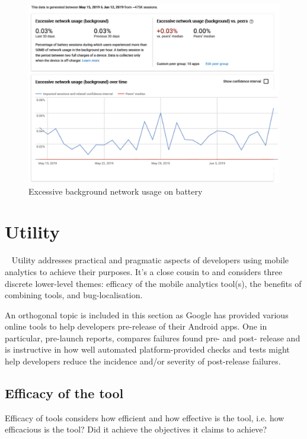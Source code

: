 \begin{figure}[!htbp]
    \centering
    \includegraphics[width=\textwidth, keepaspectratio]{images/android-vitals-screenshots/kiwix/Excessive_network_usage_by_kiwix_15_jun_2019.pdf}
    \caption{Excessive background network usage on battery}
    \label{fig:android_vitals_excessive_network_usage}
\end{figure}



\section{Utility}~\label{tata-utility-section}
Utility addresses practical and pragmatic aspects of developers using mobile analytics to achieve their purposes. It's a close cousin to  and considers three discrete lower-level themes: efficacy of the mobile analytics tool(s), the benefits of combining tools, and bug-localisation.

An orthogonal topic is included in this section as Google has provided various online tools to help developers pre-release of their Android apps. One in particular, pre-launch reports, compares failures found pre- and post- release and is instructive in how well automated platform-provided checks and tests might help developers reduce the incidence and/or severity of post-release failures.

\subsection{Efficacy of the tool}
Efficacy of tools considers how efficient and how effective is the tool, i.e. how efficacious is the tool? Did it achieve the objectives it claims to achieve?%

